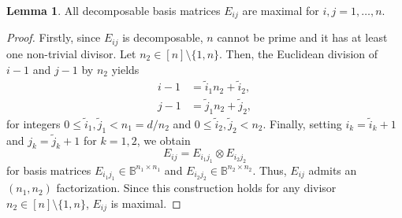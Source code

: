 \documentclass{article}
\numberwithin{equation}{section}
\theoremstyle{definition}
\newtheorem{lemma}[definition]{Lemma}
\begin{document}
\begin{lemma}
\label{lem: maximal_basis_matrix}
All decomposable basis matrices $E_{ij}$ are maximal for $i,j=1,\dots,n$.
\end{lemma}
\begin{proof}
Firstly, since $E_{ij}$ is decomposable, $n$ cannot be prime and it has at least one non-trivial divisor. Let $n_2 \in [n] \setminus \{1,n\}$. Then, the Euclidean division of $i-1$ and $j-1$ by $n_2$ yields
\begin{align*}
    i-1&=\tilde{i}_1 n_2 + \tilde{i}_2, \\
    j-1&=\tilde{j}_1 n_2 + \tilde{j}_2,
\end{align*}
for integers $0 \leq \tilde{i}_1,\tilde{j}_1 < n_1 = d/n_2$ and $0 \leq \tilde{i}_2,\tilde{j}_2 < n_2$. Finally, setting $i_k=\tilde{i}_k+1$ and $j_k = \tilde{j}_k+1$ for $k=1,2$, we obtain
\begin{equation*}
    E_{ij} = E_{i_1 j_1} \otimes E_{i_2 j_2}
\end{equation*}
for basis matrices $E_{i_1 j_1} \in \mathbb{B}^{n_1 \times n_1}$ and $E_{i_2 j_2} \in \mathbb{B}^{n_2 \times n_2}$. Thus, $E_{ij}$ admits an $(n_1,n_2)$ factorization. Since this construction holds for any divisor $n_2 \in [n] \setminus \{1,n\}$, $E_{ij}$ is maximal.
\end{proof}
\end{document}
